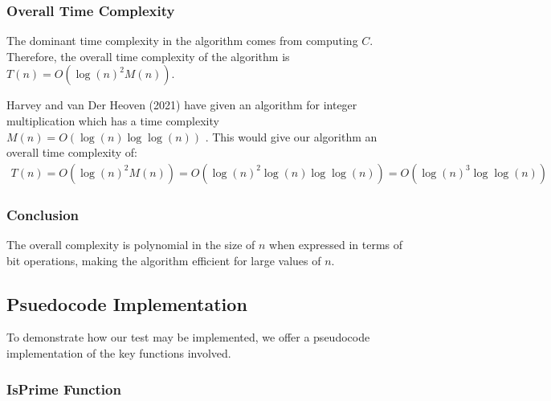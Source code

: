 \documentclass{article}
\theoremstyle{plain}
\theoremstyle{definition}
\begin{document}
\subsubsection{Overall Time Complexity}
The dominant time complexity in the algorithm comes from computing \( C \). Therefore, the overall time complexity of the algorithm is \( T(n) = O(\log(n)^2 M(n)) \).

Harvey and van Der Heoven (2021) have given an algorithm for integer multiplication which has a time complexity $M(n) = O(\log(n) \log\log(n))$ \cite{harveyvanderhoeven2021}. This would give our algorithm an overall time complexity of:
\begin{align}
    T(n) = O(\log(n)^2 M(n)) = O(\log(n)^2 \log(n) \log\log(n)) = O(\log(n)^3 \log\log(n))
\end{align}

\subsubsection{Conclusion}
The overall complexity is polynomial in the size of \( n \) when expressed in terms of bit operations, making the algorithm efficient for large values of \( n \).

\subsection{Psuedocode Implementation}
To demonstrate how our test may be implemented, we offer a pseudocode implementation of the key functions involved.

\subsubsection{IsPrime Function}
\end{document}

